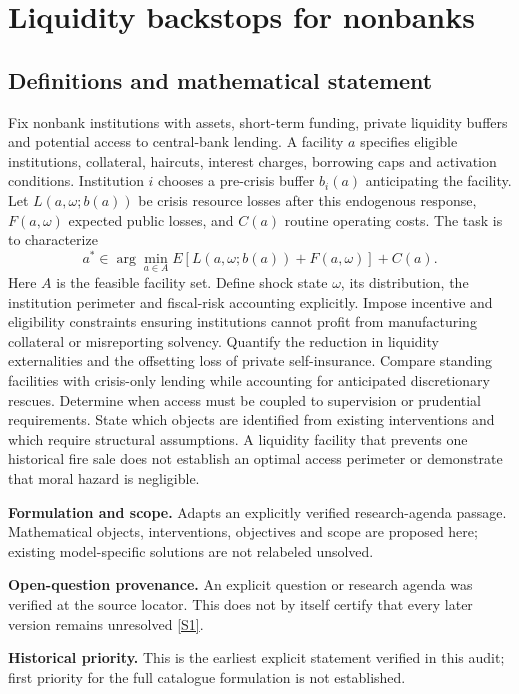 \documentclass[11pt]{article}
\newcommand{\sref}[2]{\hyperlink{source:#1:#2}{[S#2]}}
\begin{document}
\section*{Liquidity backstops for nonbanks}\label{30007608}
\subsection{Definitions and mathematical statement}
Fix nonbank institutions with assets, short-term funding, private liquidity buffers and potential access to central-bank lending. A facility \(a\) specifies eligible institutions, collateral, haircuts, interest charges, borrowing caps and activation conditions. Institution \(i\) chooses a pre-crisis buffer \(b_i(a)\) anticipating the facility. Let \(L(a,\omega;b(a))\) be crisis resource losses after this endogenous response, \(F(a,\omega)\) expected public losses, and \(C(a)\) routine operating costs. The task is to characterize
\[a^*\in\arg\min_{a\in A}E[L(a,\omega;b(a))+F(a,\omega)]+C(a).\]
Here \(A\) is the feasible facility set. Define shock state \(\omega\), its distribution, the institution perimeter and fiscal-risk accounting explicitly. Impose incentive and eligibility constraints ensuring institutions cannot profit from manufacturing collateral or misreporting solvency. Quantify the reduction in liquidity externalities and the offsetting loss of private self-insurance. Compare standing facilities with crisis-only lending while accounting for anticipated discretionary rescues. Determine when access must be coupled to supervision or prudential requirements. State which objects are identified from existing interventions and which require structural assumptions. A liquidity facility that prevents one historical fire sale does not establish an optimal access perimeter or demonstrate that moral hazard is negligible.

\par\textbf{Formulation and scope.} Adapts an explicitly verified research-agenda passage. Mathematical objects, interventions, objectives and scope are proposed here; existing model-specific solutions are not relabeled unsolved.

\par\textbf{Open-question provenance.} An explicit question or research agenda was verified at the source locator. This does not by itself certify that every later version remains unresolved \sref{30007608}{1}.

\par\textbf{Historical priority.} This is the earliest explicit statement verified in this audit; first priority for the full catalogue formulation is not established.
\end{document}
